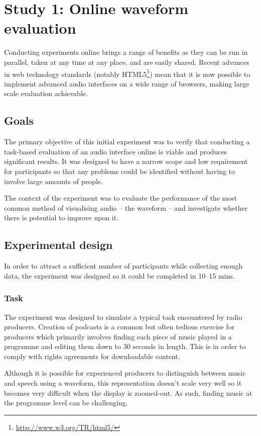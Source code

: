 \section{Study 1: Online waveform evaluation}\label{sec:study}
Conducting experiments online brings a range of benefits as they can be run in
parallel, taken at any time at any place, and are easily shared. Recent
advances in web technology standards (notably
HTML5\footnote{\url{http://www.w3.org/TR/html5/}}) mean that it is now
possible to implement advanced audio interfaces on a wide range of browsers,
making large scale evaluation achievable.

\subsection{Goals}
The primary objective of this initial experiment was to verify that conducting
a task-based evaluation of an audio interface online is viable and produces
significant results. It was designed to have a narrow scope and low requirement
for participants so that any problems could be identified without having to
involve large amounts of people.

The context of the experiment was to evaluate the performance of the most
common method of visualising audio -- the waveform -- and investigate whether
there is potential to improve upon it.

\subsection{Experimental design}
In order to attract a sufficient number of participants while collecting enough
data, the experiment was designed so it could be completed in 10--15 mins.

\subsubsection{Task}\label{sec:studytask}
The experiment was designed to simulate a typical task encountered by radio
producers. Creation of podcasts is a common but often tedious exercise for
producers which primarily involves finding each piece of music played in a
programme and editing them down to 30 seconds in length. This is in order to
comply with rights agreements for downloadable content.

Although it is possible for experienced producers to distinguish between music
and speech using a waveform, this representation doesn't scale very well so it
becomes very difficult when the display is zoomed-out. As such, finding music
at the programme level can be challenging.

